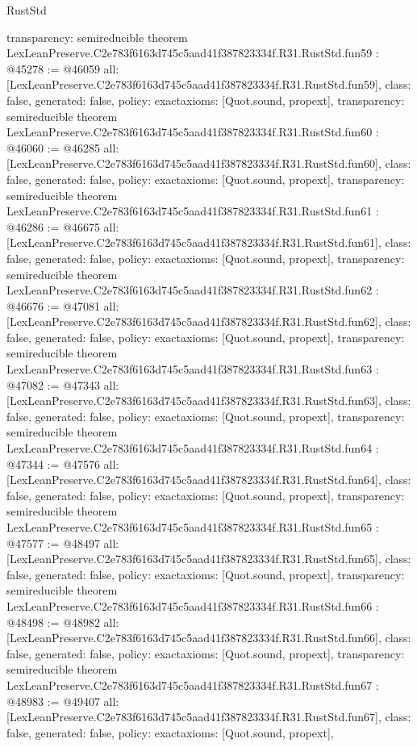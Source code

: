\begin{lexlean}{RustStd}
\begin{coremodule}
{  transparency: semireducible
}
theorem LexLeanPreserve.C2e783f6163d745c5aad41f387823334f.R31.RustStd.fun59 : @45278 := @46059 {
  all: [LexLeanPreserve.C2e783f6163d745c5aad41f387823334f.R31.RustStd.fun59],
  class: false,
  generated: false,
  policy: exact{axioms: [Quot.sound, propext]},
  transparency: semireducible
}
theorem LexLeanPreserve.C2e783f6163d745c5aad41f387823334f.R31.RustStd.fun60 : @46060 := @46285 {
  all: [LexLeanPreserve.C2e783f6163d745c5aad41f387823334f.R31.RustStd.fun60],
  class: false,
  generated: false,
  policy: exact{axioms: [Quot.sound, propext]},
  transparency: semireducible
}
theorem LexLeanPreserve.C2e783f6163d745c5aad41f387823334f.R31.RustStd.fun61 : @46286 := @46675 {
  all: [LexLeanPreserve.C2e783f6163d745c5aad41f387823334f.R31.RustStd.fun61],
  class: false,
  generated: false,
  policy: exact{axioms: [Quot.sound, propext]},
  transparency: semireducible
}
theorem LexLeanPreserve.C2e783f6163d745c5aad41f387823334f.R31.RustStd.fun62 : @46676 := @47081 {
  all: [LexLeanPreserve.C2e783f6163d745c5aad41f387823334f.R31.RustStd.fun62],
  class: false,
  generated: false,
  policy: exact{axioms: [Quot.sound, propext]},
  transparency: semireducible
}
theorem LexLeanPreserve.C2e783f6163d745c5aad41f387823334f.R31.RustStd.fun63 : @47082 := @47343 {
  all: [LexLeanPreserve.C2e783f6163d745c5aad41f387823334f.R31.RustStd.fun63],
  class: false,
  generated: false,
  policy: exact{axioms: [Quot.sound, propext]},
  transparency: semireducible
}
theorem LexLeanPreserve.C2e783f6163d745c5aad41f387823334f.R31.RustStd.fun64 : @47344 := @47576 {
  all: [LexLeanPreserve.C2e783f6163d745c5aad41f387823334f.R31.RustStd.fun64],
  class: false,
  generated: false,
  policy: exact{axioms: [Quot.sound, propext]},
  transparency: semireducible
}
theorem LexLeanPreserve.C2e783f6163d745c5aad41f387823334f.R31.RustStd.fun65 : @47577 := @48497 {
  all: [LexLeanPreserve.C2e783f6163d745c5aad41f387823334f.R31.RustStd.fun65],
  class: false,
  generated: false,
  policy: exact{axioms: [Quot.sound, propext]},
  transparency: semireducible
}
theorem LexLeanPreserve.C2e783f6163d745c5aad41f387823334f.R31.RustStd.fun66 : @48498 := @48982 {
  all: [LexLeanPreserve.C2e783f6163d745c5aad41f387823334f.R31.RustStd.fun66],
  class: false,
  generated: false,
  policy: exact{axioms: [Quot.sound, propext]},
  transparency: semireducible
}
theorem LexLeanPreserve.C2e783f6163d745c5aad41f387823334f.R31.RustStd.fun67 : @48983 := @49407 {
  all: [LexLeanPreserve.C2e783f6163d745c5aad41f387823334f.R31.RustStd.fun67],
  class: false,
  generated: false,
  policy: exact{axioms: [Quot.sound, propext]},
}
\end{coremodule}
\end{lexlean}
